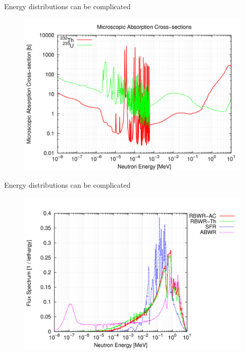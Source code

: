 \documentclass{beamer}
\begin{document}
    \begin{frame}{Energy distributions can be complicated}
        \begin{figure}
            \centering
            \includegraphics[width=1.0\textwidth]{./img/energyXs.png}
            \caption*{}
        \end{figure}
    \end{frame}

    \begin{frame}{Energy distributions can be complicated}
        \begin{figure}
            \centering
            \includegraphics[width=1.0\textwidth]{./img/energyFlux.png}
            \caption*{}
        \end{figure}
    \end{frame}
\end{document}

